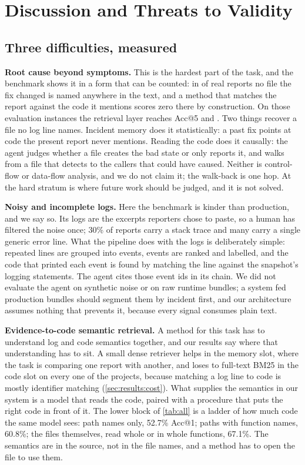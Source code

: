 \section{Discussion and Threats to Validity}
\label{sec:discussion}

\subsection{Three difficulties, measured}
\label{sec:discussion:difficulties}

\textbf{Root cause beyond symptoms.} This is the hardest part of the
task, and the benchmark shows it in a form that can be counted:
in \nHardPct{} of real reports no file the fix changed is named
anywhere in the text, and a method that matches the report against the
code it mentions scores zero there by construction. On those
\nEvalHard{} evaluation instances the retrieval layer reaches
\retrHardFive{} Acc@5 and \sys{} \hardFive{}. Two things recover a file
no log line names. Incident memory does it statistically: a past fix
points at code the present report never mentions. Reading the code does
it causally: the agent judges whether a file creates the bad state or
only reports it, and walks from a file that detects to the callers that
could have caused. Neither is control-flow or data-flow analysis, and
we do not claim it; the walk-back is one hop. At \hardFive{} the hard stratum is where future work should be
judged, and it is not solved.

\textbf{Noisy and incomplete logs.} Here the benchmark is kinder than
production, and we say so. Its logs are the excerpts reporters chose
to paste, so a human has filtered the noise once; 30\% of reports carry
a stack trace and many carry a single generic error line. What the
pipeline does with the logs is deliberately simple: repeated lines are
grouped into events, events are ranked and labelled, and the code that
printed each event is found by matching the line against the
snapshot's logging statements. The agent cites those event ids in its
chain. We did not evaluate the agent on synthetic noise or on raw
runtime bundles; a system fed production bundles should segment them by
incident first, and our architecture assumes nothing that prevents it,
because every signal consumes plain text.

\textbf{Evidence-to-code semantic retrieval.} A method for this task
has to understand log and code semantics together, and our results say
where that understanding has to sit. A small dense
retriever helps in the memory slot, where the task is comparing one
report with another, and loses to full-text BM25 in the code slot on
every one of the \nProjects{} projects, because matching a log line to
code is mostly identifier matching (\cref{sec:results:cost}). What
supplies the semantics in our system is a model that reads the code,
paired with a procedure that puts the right code in front of it.
The lower block of \cref{tab:all} is a ladder of how much code the same
model sees: path names only, 52.7\% Acc@1; paths with function names,
60.8\%; the files themselves, read whole or in whole functions, 67.1\%.
The semantics are
in the source, not in the file names, and a method has to open the file
to use them.

